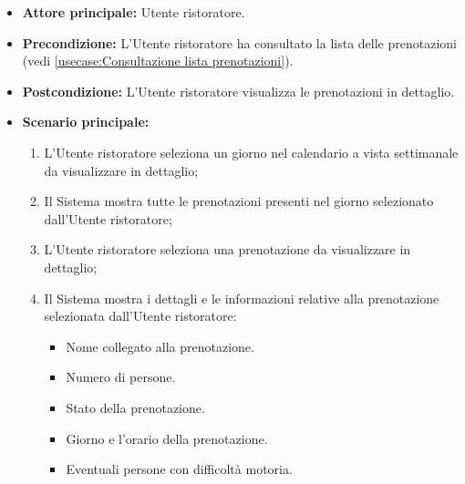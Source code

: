\label{usecase:Visualizza dettaglio lista prenotazioni}
\begin{itemize}
	\item \textbf{Attore principale:} Utente ristoratore.

	\item \textbf{Precondizione:} L'Utente ristoratore ha consultato la lista delle prenotazioni (vedi \autoref{usecase:Consultazione lista prenotazioni}).

	\item \textbf{Postcondizione:} L'Utente ristoratore visualizza le prenotazioni in dettaglio.


	\item \textbf{Scenario principale:}
	      \begin{enumerate}
		      \item L'Utente ristoratore seleziona un giorno nel calendario a vista settimanale da visualizzare in dettaglio;
		      \item Il Sistema mostra tutte le prenotazioni presenti nel giorno selezionato dall'Utente ristoratore;
		      
		      \item L'Utente ristoratore seleziona una prenotazione da visualizzare in dettaglio;
		      \item Il Sistema mostra i dettagli e le informazioni relative alla prenotazione selezionata dall'Utente ristoratore:
		      \begin{itemize}
				\item Nome collegato alla prenotazione.
				\item Numero di persone.
				\item Stato della prenotazione.
				\item Giorno e l'orario della prenotazione.
				\item Eventuali persone con difficoltà motoria.
			  \end{itemize}

	      \end{enumerate}
\end{itemize}